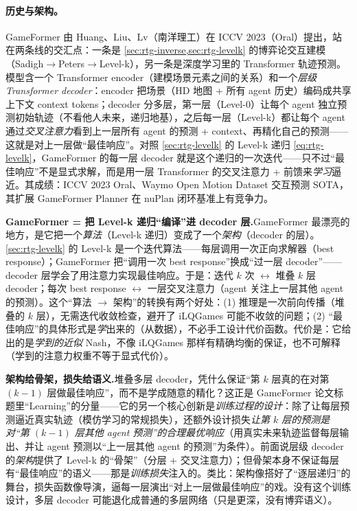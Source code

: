 \paragraph{历史与架构。}
GameFormer 由 Huang、Liu、Lv（南洋理工）在 ICCV 2023（Oral）提出\cite{huang2023gameformer}，站在两条线的交汇点：一条是 \cref{sec:rtg-inverse,sec:rtg-levelk} 的博弈论交互建模（Sadigh$\to$Peters$\to$Level-k），另一条是深度学习里的 Transformer 轨迹预测。模型含一个 Transformer encoder（建模场景元素之间的关系）和一个\emph{层级 Transformer decoder}：encoder 把场景（HD 地图 + 所有 agent 历史）编码成共享上下文 context tokens；decoder 分多层，第一层（Level-0）让每个 agent 独立预测初始轨迹（不看他人未来，递归地基），之后每一层（Level-k）都让每个 agent 通过\emph{交叉注意力}看到上一层所有 agent 的预测 + context、再精化自己的预测——这就是对上一层做“最佳响应”。对照 \cref{sec:rtg-levelk} 的 Level-k 递归 \cref{eq:rtg-levelk}，GameFormer 的每一层 decoder 就是这个递归的一次迭代——只不过“最佳响应”不是显式求解，而是用一层 Transformer 的交叉注意力 + 前馈来\emph{学习}逼近。其成绩：ICCV 2023 Oral、Waymo Open Motion Dataset 交互预测 SOTA，其扩展 GameFormer Planner 在 nuPlan 闭环基准上有竞争力\cite{huang2023gameformer}。

\begin{insight}
\textbf{GameFormer = 把 Level-k 递归“编译”进 decoder 层.}\;GameFormer 最漂亮的地方，是它把一个\emph{算法}（Level-k 递归）变成了一个\emph{架构}（decoder 的层）。\cref{sec:rtg-levelk} 的 Level-k 是一个迭代算法——每层调用一次正向求解器（best response）；GameFormer 把“调用一次 best response”换成“过一层 decoder”——decoder 层学会了用注意力实现最佳响应。于是：迭代 $k$ 次 $\leftrightarrow$ 堆叠 $k$ 层 decoder；每次 best response $\leftrightarrow$ 一层交叉注意力（agent 关注上一层其他 agent 的预测）。这个“算法 $\to$ 架构”的转换有两个好处：(1) 推理是一次前向传播（堆叠的 $k$ 层），无需迭代收敛检查，避开了 iLQGames 可能不收敛的问题；(2) “最佳响应”的具体形式是\emph{学}出来的（从数据），不必手工设计代价函数。代价是：它给出的是\emph{学到的近似} Nash，不像 iLQGames 那样有精确均衡的保证，也不可解释（学到的注意力权重不等于显式代价）。
\end{insight}

\begin{insight}
\textbf{架构给骨架，损失给语义.}\;堆叠多层 decoder，凭什么保证“第 $k$ 层真的在对第 $(k-1)$ 层做最佳响应”，而不是学成随意的精化？这正是 GameFormer 论文标题里“Learning”的分量——它的另一个核心创新是\emph{训练过程的设计}：除了让每层预测逼近真实轨迹（模仿学习的常规损失），还额外设计损失\emph{让第 $k$ 层的预测是对“第 $(k-1)$ 层其他 agent 预测”的合理最优响应}（用真实未来轨迹监督每层输出、并让 agent 预测以“上一层其他 agent 的预测”为条件）。前面说层级 decoder 的\emph{架构}提供了 Level-k 的“骨架”（分层 + 交叉注意力）；但骨架本身不保证每层有“最佳响应”的语义——那是\emph{训练损失}注入的。类比：架构像搭好了“逐层递归”的舞台，损失函数像导演，逼每一层演出“对上一层做最佳响应”的戏。没有这个训练设计，多层 decoder 可能退化成普通的多层网络（只是更深，没有博弈语义）。
\end{insight}

